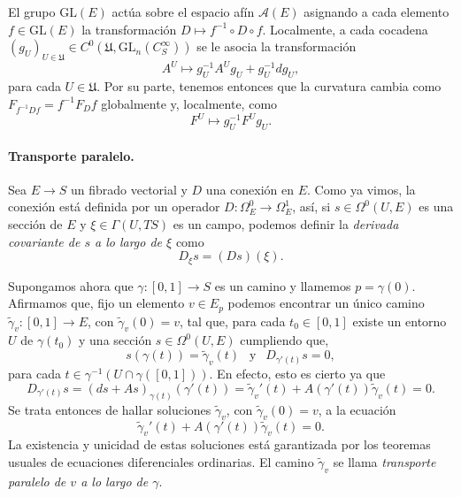 \documentclass[12pt,a4paper]{article}
\theoremstyle{definition} \newtheorem{defn}[thm]{Definición}
\theoremstyle{definition} \newtheorem{ejemplo}[thm]{Ejemplo}
\theoremstyle{definition} \newtheorem{ejercicio}[thm]{Ejercicio}
\def\UU{\mathfrak{U}}
\def\GL{\mathrm{GL}}
\begin{document}
	  El grupo $\GL(E)$ actúa sobre el espacio afín $\mathcal{A}(E)$ asignando a cada elemento $f \in \GL(E)$ la transformación $D \mapsto f^{-1} \circ D \circ f$.
 Localmente, a cada cocadena $(g_U)_{U \in \UU} \in C^0(\UU,\GL_n(C^\infty_S))$ se le asocia la transformación 
	  \begin{equation*}
	    A^U \longmapsto g_U^{-1} A^U g_U + g_U^{-1} dg_U,
	  \end{equation*}
	  para cada $U\in \UU$. Por su parte, tenemos entonces que la curvatura cambia como $F_{f^{-1} D f} = f^{-1} F_D f$ globalmente y, localmente, como
	  \begin{equation*}
	    F^U \longmapsto g_U^{-1} F^U g_U.
	  \end{equation*}

	  \paragraph{Transporte paralelo.} Sea $E\rightarrow S$ un fibrado vectorial y $D$ una conexión en $E$. Como ya vimos, la conexión está definida por un operador $D:\Omega^0_E \rightarrow \Omega^1_E$, así, si $s \in \Omega^0(U,E)$ es una sección de $E$ y $\xi \in \Gamma(U,TS)$ es un campo, podemos definir la \emph{derivada covariante de $s$ a lo largo de $\xi$} como
	  \begin{equation*}
	    D_\xi s = (Ds)(\xi).
	  \end{equation*}

	  Supongamos ahora que $\gamma:[0,1] \rightarrow S$ es un camino y llamemos $p=\gamma(0)$. Afirmamos que, fijo un elemento $v \in E_p$ podemos encontrar un único camino $\tilde{\gamma}_v:[0,1] \rightarrow E$, con $\tilde{\gamma}_v(0)=v$, tal que, para cada $t_0\in [0,1]$ existe un entorno $U$ de $\gamma(t_0)$ y una sección $s\in \Omega^0(U,E)$ cumpliendo que, 
	  \begin{equation*}
	    s(\gamma(t)) = \tilde{\gamma}_v (t) \ \ \text{ y } \ \ D_{\gamma'(t)} s = 0,
	  \end{equation*}
	  para cada $t \in \gamma^{-1}(U \cap \gamma([0,1]))$. En efecto, esto es cierto ya que
	  \begin{equation*}
	    D_{\gamma'(t)} s= (ds + As)_{\gamma(t)} (\gamma'(t))= \tilde{\gamma}_v'(t) + A(\gamma'(t)) \tilde{\gamma}_v(t) =0.
	  \end{equation*}
	  Se trata entonces de hallar soluciones $\tilde{\gamma}_v$, con $\tilde{\gamma}_v(0)=v$, a la ecuación
	  \begin{equation*}
	    \tilde{\gamma}_v'(t) + A(\gamma'(t))\tilde{\gamma}_v(t) = 0.
	  \end{equation*}
	  La existencia y unicidad de estas soluciones está garantizada por los teoremas usuales de ecuaciones diferenciales ordinarias. El camino $\tilde{\gamma}_v$ se llama \emph{transporte paralelo de $v$ a lo largo de $\gamma$}. 
\end{document}
